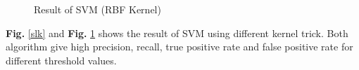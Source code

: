 \begin{figure}[H]
\centering
{}%
\hfill %
%
\caption{Result of SVM (RBF Kernel)}
\label{svr}
\end{figure}
\noindent
\textbf{Fig.} \ref{slk} and \textbf{Fig.} \ref{svr} shows the result of SVM using different kernel trick. Both algorithm give high precision, recall, true positive rate and false positive rate for different threshold values.  


